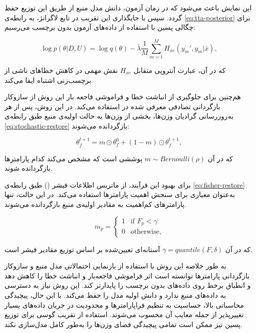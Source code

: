 این نمایش باعث می‌شود که در زمان آزمون، دانش مدل منبع از طریق این توزیع حفظ گردد. سپس با جایگذاری این تقریب در تابع {لاگرانژ}، به رابطه‌ی \ref{eq:tta-posterior} برای چگالی پسین با استفاده از داده‌های آزمون بدون برچسب می‌رسیم\cite{petal}:  

\begin{equation}
	\log p(\theta | D, U) = \log q(\theta) - \bar{\lambda}\frac{1}{M}\sum_{m=1}^{M} H_{xe}(y_m', y_m | \bar{x}),
	\label{eq:tta-posterior}
\end{equation}

که در آن، عبارت آنتروپی متقابل \(H_{xe}\) نقش مهمی در کاهش خطاهای ناشی از برچسب‌زنی اشتباه ایفا می‌کند.  

هم‌چنین ‌برای جلوگیری از انباشت خطا و فراموشی فاجعه بار این روش از سازوکار بازگردانی تصادفی معرفی شده در \cite{cotta} استفاده می‌کند. در این روش، پس از هر به‌روزرسانی گرادیان وزن‌ها، بخشی از وزن‌ها به حالت اولیه‌ی منبع طبق رابطه‌ی \ref{eq:stochastic-restore} بازگردانده می‌شوند\cite{petal}: 

\begin{equation}
	\theta^{t+1}_f = m \odot \theta^0_f + (1 - m) \odot \theta^{t+1}_f, 
	\label{eq:stochastic-restore}
\end{equation}

که در آن \(m \sim Bernoulli(\rho)\) {پوششی} است که مشخص می‌کند کدام پارامترها بازگردانده شوند.  

برای بهبود این فرآیند،  از ماتریس اطلاعات فیشر () \cite{ewc} طبق رابطه‌ی \ref{eq:fisher-restore} به‌عنوان معیاری برای سنجش اهمیت پارامترها استفاده می‌کند. در این حالت، تنها پارامترهای کم‌اهمیت به مقادیر اولیه‌ی منبع بازگردانده می‌شوند\cite{petal}.

\begin{equation}
	m_p = 
	\begin{cases}
		1 & \text{if } F_p < \gamma \\
		0 & \text{otherwise},
	\end{cases}
	\label{eq:fisher-restore}
\end{equation}

که در آن \(\gamma = quantile(F, \delta)\) آستانه‌ای تعیین‌شده بر اساس توزیع مقادیر فیشر است.  

به طور خلاصه این روش با استفاده از بازنمایی احتمالاتی مدل منبع و سازوکار بازگردانی پارامترها توانسته است اثر فراموشی فاجعه‌بار و انباشت خطا را کاهش دهد و انطباق برخط روی داده‌های بدون برچسب را پایدارتر کند. این روش نیاز به دسترسی به داده‌های منبع ندارد و دانش اولیه مدل را حفظ می‌کند. با این حال، پیچیدگی محاسباتی بالا، حساسیت به تنظیم فرا‌پارامتر‌ها و محدودیت در جریان داده‌های بسیار تغییرپذیر از جمله معایب آن محسوب می‌شوند. استفاده از تقریب {گوسی} برای توزیع پسین نیز ممکن است تمامی پیچیدگی فضای وزن‌ها را به‌طور کامل مدل‌سازی نکند.

